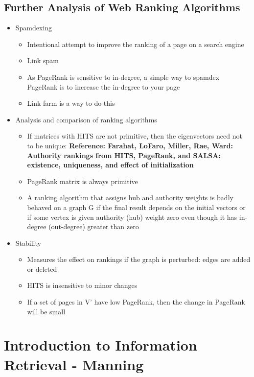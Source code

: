 \documentclass[11pt]{report}
\begin{document}
\section{Further Analysis of Web Ranking Algorithms}
\begin{itemize}
\item Spamdexing
\begin{itemize}
\item Intentional attempt to improve the ranking of a page on a search engine 
\item Link spam
\item As PageRank is sensitive to in-degree, a simple way to spamdex PageRank is to increase the in-degree to your page
\item Link farm is a way to do this
\end{itemize}
\item Analysis and comparison of ranking algorithms
\begin{itemize}
\item If matrices with HITS are not primitive, then the eigenvectors need not to be unique: \textbf{Reference: Farahat, LoFaro, Miller, Rae, Ward: Authority rankings from HITS, PageRank, and SALSA: existence, uniqueness, and effect of initialization}
\item PageRank matrix is always primitive
\item A ranking algorithm that assigns hub and authority weights is badly behaved on a graph G if the final result depends on the initial vectors or if some vertex is given authority (hub) weight zero even though it has in-degree (out-degree) greater than zero
\end{itemize}
\item Stability
\begin{itemize}
\item Measures the effect on rankings if the graph is perturbed: edges are added or deleted
\item HITS is insensitive to minor changes
\item If a set of pages in V' have low PageRank, then the change in PageRank will be small
\end{itemize}
\end{itemize}
\chapter{Introduction to Information Retrieval - Manning}
\end{document}
